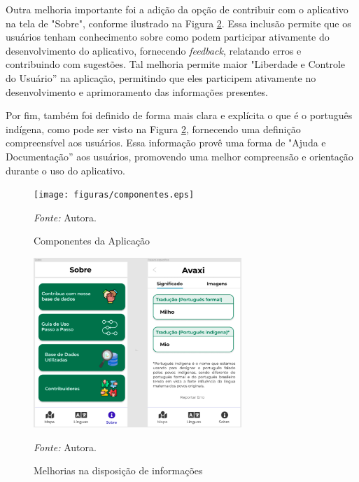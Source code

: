 Outra melhoria importante foi a adição da opção de contribuir com o aplicativo na tela de "Sobre", conforme ilustrado na Figura \ref{fig27}. Essa inclusão permite que os usuários tenham conhecimento sobre como podem participar ativamente do desenvolvimento do aplicativo, 
fornecendo \textit{feedback}, relatando erros e contribuindo com sugestões. Tal melhoria permite maior "Liberdade e Controle do Usuário'' na aplicação, permitindo que eles participem ativamente no desenvolvimento e aprimoramento 
das informações presentes.

Por fim, também foi definido de forma mais clara e explícita o que é o português indígena, como pode ser visto na Figura \ref{fig27}, fornecendo uma definição compreensível aos usuários. Essa informação provê uma forma de "Ajuda e Documentação'' aos usuários, promovendo uma melhor 
compreensão e orientação durante o uso do aplicativo.

\begin{figure}[h!]
	\centering
	\caption{Componentes da Aplicação}
	\begin{adjustbox}{center}
		\texttt{[image: figuras/componentes.eps]}
	\end{adjustbox}
	\begin{tablenotes}[flushleft]
		\centering
		\item \textit{Fonte:} Autora.
	\end{tablenotes}
	\label{fig26}
\end{figure}

\begin{figure}[h!]
	\centering
	\caption{Melhorias na disposição de informações}
	\begin{adjustbox}{center}
		\includegraphics[width=0.7\textwidth]{figuras/melhorias.eps}
	\end{adjustbox}
	\begin{tablenotes}[flushleft]
		\centering
		\item \textit{Fonte:} Autora.
	\end{tablenotes}
	\label{fig27}
\end{figure}

